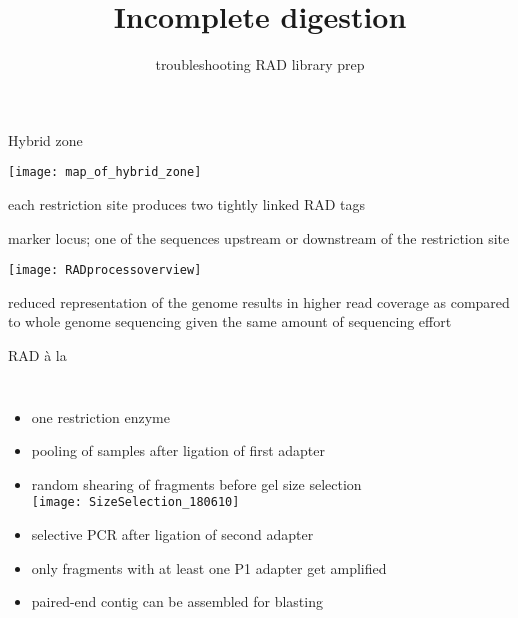 \documentclass[xcolor=pdftex, dvipsnames, table]{beamer}
\title{Incomplete digestion}
\subtitle{troubleshooting RAD library prep \vskip80pt}
\institute{
\raggedright
{\large{Claudius Kerth}}\\
	\vskip15pt
	\hskip4pt
	\textit{c.kerth@shef.ac.uk}
}
\date{ \raggedright \small{24 Feb 2015}}
\begin{document}

{
%
\frame{
\titlepage	%
}
}

\begin{frame}{Hybrid zone}
\begin{center}
\texttt{[image: map\_of\_hybrid\_zone]}
\end{center}
\end{frame}


\begin{frame}{each restriction site produces two tightly linked RAD tags}
\begin{center}
\begin{description}
\footnotesize
\item[RAD tag] marker locus; one of the sequences upstream or downstream of the restriction site
\end{description}
\vskip15pt
\texttt{[image: RADprocessoverview]}
\begin{block}{}
\centering
\scriptsize
reduced representation of the genome results in higher read coverage as compared to whole genome sequencing given the same amount of sequencing effort
\end{block}
\end{center}
\end{frame}
%
%
%
\begin{frame}[label=sRAD]{RAD \`a la \cite{Baird2008}}
\centering
\begin{columns}
\begin{itemize}[<+->]
\scriptsize
\item<1-> one restriction enzyme \smallskip
\item<1-> pooling of samples after ligation of first adapter \smallskip
\item<1-> random shearing of fragments before gel size selection \\
\texttt{[image: SizeSelection\_180610]} \smallskip
\item<2-> selective PCR after ligation of second adapter \smallskip
\item<2-> only fragments with at least one P1 adapter get amplified \smallskip
\item<3-> paired-end contig can be assembled for blasting
\end{itemize}
\end{columns}
\end{frame}
\end{document}
